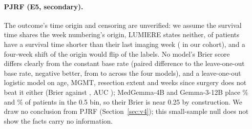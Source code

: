 \documentclass[11pt]{article}
\begin{document}
\paragraph{PJRF (E5, secondary).} The outcome's time origin and censoring are unverified: we assume the survival time shares the week numbering's origin, LUMIERE states neither, \vfourPjrfOsShort{} of \vfourPjrfOsN{} patients have a survival time shorter than their last imaging week (\vfourPjrfOsShortCohort{} in our cohort), and a four-week shift of the origin would flip \vfourPjrfFlipFour{} of the \vfourNPJRF{} labels. No model's Brier score differs clearly from the constant base rate (paired difference to the leave-one-out base rate, negative better, from \vfourEfiveDiffGemmaTwentySeven{} to \vfourEfiveDiffScout{} across the four models), and a leave-one-out logistic model on age, MGMT, resection extent and weeks since surgery does not beat it either (Brier \vfourPjrfBrierLR{} against \vfourPjrfBrierBase{}, AUC \vfourPjrfAucLR{}); MedGemma-4B and Gemma-3-12B place \vfourEfiveMidMedGemma{}\% and \vfourEfiveMidGemmaTwelve{}\% of patients in the 0.5 bin, so their Brier is near 0.25 by construction. We draw no conclusion from PJRF (Section~\ref{sec:v4}); this small-sample null does not show the facts carry no information.
\end{document}
